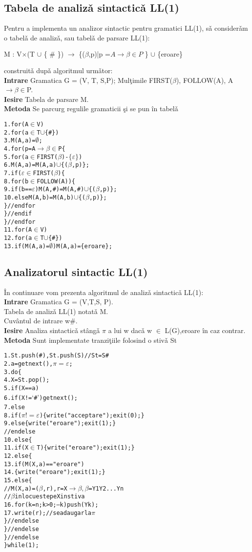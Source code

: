 \subsection{Tabela de analiz\v a sintactic\v a LL(1)}
Pentru a implementa un analizor
sintactic pentru gramatici LL(1), s\v a consider\v am o tabel\v a de analiz\v a, sau
tabel\v a de parsare LL(1):\\
\begin{flushleft}
  M : V$\times$(T $\cup$ \{ \# \})
   $\rightarrow$ \{($\beta$,p)|p =$A \rightarrow \beta \in P$ \}   $\cup$ \{eroare\} 
  \end{flushleft}  
construit\v a dup\v a algoritmul urm\v ator: \\
\textbf{Intrare}  Gramatica G = (V, T, S,P); 
Mul\c timile FIRST($\beta$), FOLLOW(A), A$\rightarrow \beta \in $P. \\
\textbf{Iesire} Tabela de parsare M.\\
\textbf{Metoda} Se parcurg regulile gramaticii \c si se pun \^in tabel\v a\\
\begin{alltt}
1.for(A\(\in\)V) 
2.	for(a \(\in\) T \(\cup\) \{ # \})
3. 	   M(A,a)=\( \emptyset \);
4.for(p=A\( \rightarrow\beta \in \)P \{
5. for(a \( \in \) FIRST(\( \beta \))- \(\{ \varepsilon \} \))
6.		M(A,a)=M(A,a)\( \cup \)\{(\( \beta \),p )\};
7.	if(\(\varepsilon \in\) FIRST(\( \beta \))\{
8. 		for(b \( \in \) FOLLOW(A)) \{
9.			if(b == \(\varepsilon \)) M(A,\#)=M(A,\#) \( \cup \) \{(\(\beta\),p)\};
10.			else M(A,b)=M(A,b)\(\cup\)\{(\(\beta\),p)\};
		\}//endfor
	\}//endif
\}//endfor
11. for(A\(\in \)V)
12.		for(a \(\in\)T\(\cup\)\{\#\})
13.  if(M(A,a)=\(\emptyset\)) M(A,a)=\{eroare\}; 
\end{alltt}
\subsection{Analizatorul sintactic LL(1)}
 \^ In continuare vom prezenta algoritmul de analiz\v a sintactic\v a LL(1):\\
\textbf{Intrare}    Gramatica G = (V,T,S, P).\\
Tabela de analiz\v a LL(1) notat\v a M.\\
Cuv\^ antul de intrare w\#.\\
\textbf{Iesire} Analiza sintactic\v a st\^ ang\v a $\pi$ a lui w dac\v a w $\in$ L(G),eroare \^ in caz contrar.\\
\textbf{Metoda} Sunt implementate tranzi\c tiile folosind o stiv\v a St\\
\begin{alltt}
1.St.push(\#),St.push(S)// St = S\#
2.a = getnext(),\(\pi = \varepsilon\);
3.do \{
4.X = St.pop();
5.if(X == a)
6.if(X != ‘\# ’) getnext();
7.else{
8.if (\( \pi != \varepsilon\)) \{write("acceptare"); exit(0);\}
9.else \{write("eroare"); exit(1);\}
} //endelse
10.else \{
11.if(X\(\in\)T)\{write("eroare"); exit(1);\}
12.else \{
13.if(M(X,a) == "eroare")
14.\{write("eroare"); exit(1);\}
15.else \{
// M(X,a)=(\(\beta\),r), r=X\(\rightarrow\)\(\beta ,\beta\)=Y1Y2...Yn
//\(\beta\) inlocueste pe X in stiva
16.for(k = n; k>0; --k) push(Yk);
17.write(r); //se adauga r la \(\pi\)
\} //endelse
\} //endelse
\} //endelse
\} while(1);

\end{alltt} 
